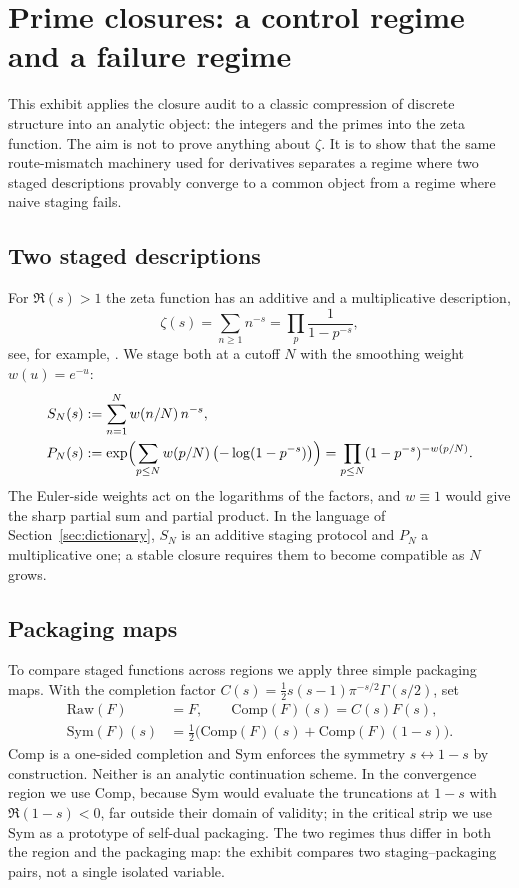 \section{Prime closures: a control regime and a failure regime}
\label{sec:exhibit-prime}

This exhibit applies the closure audit to a classic compression of discrete structure into an analytic object: the integers and the primes into the zeta function.
The aim is not to prove anything about $\zeta$.
It is to show that the same route-mismatch machinery used for derivatives separates a regime where two staged descriptions provably converge to a common object from a regime where naive staging fails.

\subsection{Two staged descriptions}
For $\Re(s)>1$ the zeta function has an additive and a multiplicative description,
\[
  \zeta(s)=\sum_{n\ge 1}n^{-s}=\prod_p\frac{1}{1-p^{-s}},
\]
see, for example, \cite{Titchmarsh1986}.
We stage both at a cutoff $N$ with the smoothing weight $w(u)=e^{-u}$:
\begin{align*}
  S_N(s)&:=\sum_{n=1}^{N}w(n/N)\,n^{-s},\\
  P_N(s)&:=\exp\Bigl(\sum_{p\le N}w(p/N)\,\bigl(-\log(1-p^{-s})\bigr)\Bigr)=\prod_{p\le N}(1-p^{-s})^{-w(p/N)}.
\end{align*}
The Euler-side weights act on the logarithms of the factors, and $w\equiv 1$ would give the sharp partial sum and partial product.
In the language of Section~\ref{sec:dictionary}, $S_N$ is an additive staging protocol and $P_N$ a multiplicative one; a stable closure requires them to become compatible as $N$ grows.

\subsection{Packaging maps}
To compare staged functions across regions we apply three simple packaging maps.
With the completion factor $C(s)=\tfrac12 s(s-1)\pi^{-s/2}\Gamma(s/2)$, set
\begin{align*}
  \mathrm{Raw}(F)&=F, \qquad \mathrm{Comp}(F)(s)=C(s)F(s),\\
  \mathrm{Sym}(F)(s)&=\tfrac12\bigl(\mathrm{Comp}(F)(s)+\mathrm{Comp}(F)(1-s)\bigr).
\end{align*}
$\mathrm{Comp}$ is a one-sided completion and $\mathrm{Sym}$ enforces the symmetry $s\leftrightarrow 1-s$ by construction.
Neither is an analytic continuation scheme.
In the convergence region we use $\mathrm{Comp}$, because $\mathrm{Sym}$ would evaluate the truncations at $1-s$ with $\Re(1-s)<0$, far outside their domain of validity; in the critical strip we use $\mathrm{Sym}$ as a prototype of self-dual packaging.
The two regimes thus differ in both the region and the packaging map: the exhibit compares two staging--packaging pairs, not a single isolated variable.

